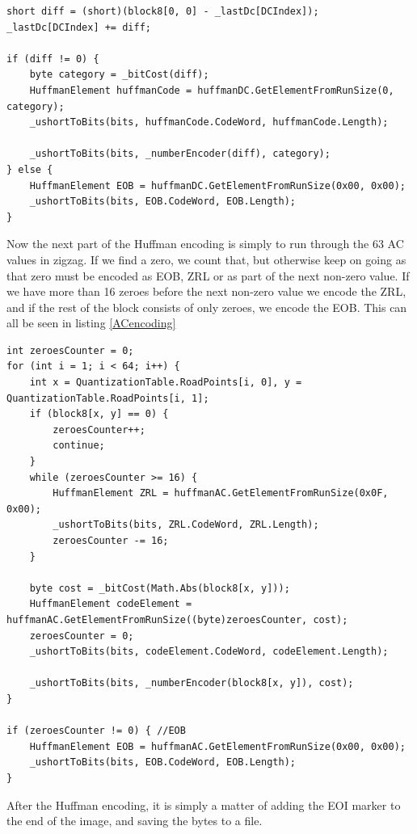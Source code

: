 \begin{lstlisting}[label=DCencoding,caption={Encoding DC coefficient into the image \textbf{File: }JPEGImage.cs}]
short diff = (short)(block8[0, 0] - _lastDc[DCIndex]);
_lastDc[DCIndex] += diff;

if (diff != 0) {
    byte category = _bitCost(diff);
    HuffmanElement huffmanCode = huffmanDC.GetElementFromRunSize(0, category);
    _ushortToBits(bits, huffmanCode.CodeWord, huffmanCode.Length);

    _ushortToBits(bits, _numberEncoder(diff), category);
} else {
    HuffmanElement EOB = huffmanDC.GetElementFromRunSize(0x00, 0x00);
    _ushortToBits(bits, EOB.CodeWord, EOB.Length);
}
\end{lstlisting}

Now the next part of the Huffman encoding is simply to run through the 63 AC values in zigzag.
If we find a zero, we count that, but otherwise keep on going as that zero must be encoded as EOB, ZRL or as part of the next non-zero value.
If we have more than 16 zeroes before the next non-zero value we encode the ZRL, and if the rest of the block consists of only zeroes, we encode the EOB. This can all be seen in listing \ref{ACencoding}

\begin{lstlisting}[label=ACencoding,caption={Encoding AC coefficients into the image \textbf{File: }JPEGImage.cs}]
int zeroesCounter = 0;
for (int i = 1; i < 64; i++) {
    int x = QuantizationTable.RoadPoints[i, 0], y = QuantizationTable.RoadPoints[i, 1];
    if (block8[x, y] == 0) {
        zeroesCounter++;
        continue;
    }
    while (zeroesCounter >= 16) {
        HuffmanElement ZRL = huffmanAC.GetElementFromRunSize(0x0F, 0x00);
        _ushortToBits(bits, ZRL.CodeWord, ZRL.Length);
        zeroesCounter -= 16;
    }

    byte cost = _bitCost(Math.Abs(block8[x, y]));
    HuffmanElement codeElement = huffmanAC.GetElementFromRunSize((byte)zeroesCounter, cost);
    zeroesCounter = 0;
    _ushortToBits(bits, codeElement.CodeWord, codeElement.Length);

    _ushortToBits(bits, _numberEncoder(block8[x, y]), cost);
}

if (zeroesCounter != 0) { //EOB
    HuffmanElement EOB = huffmanAC.GetElementFromRunSize(0x00, 0x00);
    _ushortToBits(bits, EOB.CodeWord, EOB.Length);
}
\end{lstlisting}

After the Huffman encoding, it is simply a matter of adding the EOI marker to the end of the image, and saving the bytes to a file. 

